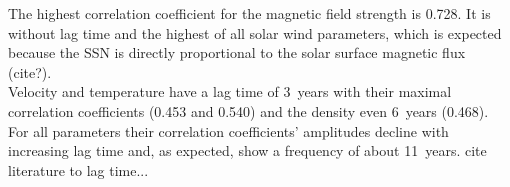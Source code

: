 The highest correlation coefficient for the magnetic field strength is 0.728. It is without lag time and the highest of all solar wind parameters, which is expected because the SSN is directly proportional to the solar surface magnetic flux (cite?).\\
Velocity and temperature have a lag time of 3~years with their maximal correlation coefficients (0.453 and 0.540) and the density even 6~years (0.468).\\
For all parameters their correlation coefficients' amplitudes decline with increasing lag time and, as expected, show a frequency of about 11~years.
cite literature to lag time...\\

